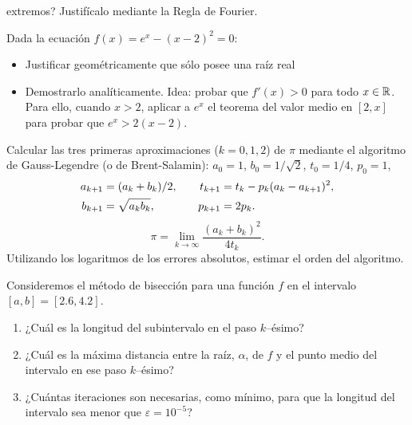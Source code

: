 \begin{problemas}
\begin{problema}
    extremos? Justifícalo mediante la Regla de Fourier.
  \end{problema}
  \begin{problema}
    Dada la ecuación $f(x)=e^x-(x-2)^2=0$:
    \begin{itemize}
    \item Justificar geométricamente que sólo posee una raíz real
    \item Demostrarlo analíticamente. Idea: probar que $f'(x)>0$ para
      todo $x\in\operatorname{{\mathbb R}}$. Para ello, cuando $x>2$, aplicar a $e^x$ el
      teorema del valor medio en $[2,x]$ para probar que $e^x>2(x-2)$.
    \end{itemize}
  \end{problema}
  \begin{problema}
    Calcular las tres primeras aproximaciones ($k=0,1,2$) de $\pi$
    mediante el algoritmo de Gauss-Legendre (o de Brent-Salamin):
    $a_0=1$, $b_0=1/\sqrt 2$, $t_0=1/4$, $p_0=1$,
    \begin{align*}
      a_{k+1}&=(a_{k}+b_{k})/2 , &\quad
      t_{k+1}&=t_k - p_k(a_k -a_{k+1})^2, \\
      b_{k+1}& =\sqrt{a_{k}\*b_{k}}, &\quad p_{k+1}&=2p_k.
    \end{align*}
    $$
    \pi = \lim_{k\to\infty} \frac{(a_k+b_k)^2}{4t_k}.
    $$
    Utilizando los logaritmos de los errores absolutos, estimar el
    orden del algoritmo.
  \end{problema}
  \begin{problema}
    Consideremos el método de bisección para
    una función $f$ en el intervalo $[a,b]=[2.6,4.2]$.
    \begin{enumerate}
    \item ¿Cuál es la longitud del subintervalo en el paso $k$--ésimo?
    \item ¿Cuál es la máxima distancia entre la raíz, $\alpha$, de $f$
      y el punto medio del intervalo en ese paso $k$--ésimo?
    \item ¿Cuántas iteraciones son necesarias, como mínimo, para que
      la longitud del intervalo sea menor que $\varepsilon=10^{-5}$?
    \end{enumerate}
  \end{problema}
\end{problemas}

